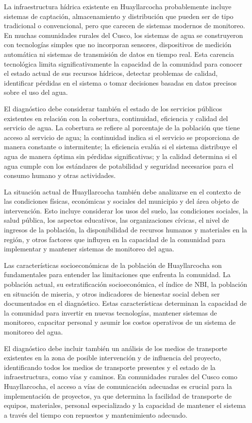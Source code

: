 La infraestructura hídrica existente en Huayllarcocha probablemente incluye sistemas de captación, almacenamiento y distribución que pueden ser de tipo tradicional o convencional, pero que carecen de sistemas modernos de monitoreo. En muchas comunidades rurales del Cusco, los sistemas de agua se construyeron con tecnologías simples que no incorporan sensores, dispositivos de medición automática ni sistemas de transmisión de datos en tiempo real. Esta carencia tecnológica limita significativamente la capacidad de la comunidad para conocer el estado actual de sus recursos hídricos, detectar problemas de calidad, identificar pérdidas en el sistema o tomar decisiones basadas en datos precisos sobre el uso del agua.

El diagnóstico debe considerar también el estado de los servicios públicos existentes en relación con la cobertura, continuidad, eficiencia y calidad del servicio de agua. La cobertura se refiere al porcentaje de la población que tiene acceso al servicio de agua; la continuidad indica si el servicio se proporciona de manera constante o intermitente; la eficiencia evalúa si el sistema distribuye el agua de manera óptima sin pérdidas significativas; y la calidad determina si el agua cumple con los estándares de potabilidad y seguridad necesarios para el consumo humano y otras actividades.


La situación actual de Huayllarcocha también debe analizarse en el contexto de las condiciones físicas, económicas y sociales del municipio y del área objeto de intervención. Esto incluye considerar los usos del suelo, las condiciones sociales, la salud pública, los aspectos educativos, las organizaciones cívicas, el nivel de ingresos de la población, la disponibilidad de recursos humanos y materiales en la región, y otros factores que influyen en la capacidad de la comunidad para implementar y mantener sistemas de monitoreo del agua.


Las características socioeconómicas de la población de Huayllarcocha son fundamentales para entender las limitaciones que enfrenta la comunidad. La población actual, su estratificación socioeconómica, el índice de NBI, la población en situación de miseria, y otros indicadores de bienestar social deben ser documentados en el diagnóstico. Estas características determinan la capacidad de la comunidad para invertir en nuevas tecnologías, mantener sistemas de monitoreo, capacitar personal y asumir los costos operativos de un sistema de monitoreo del agua.


El diagnóstico debe incluir también un análisis de los medios de transporte existentes en la zona de posible intervención y de influencia del proyecto, identificando todos los medios de transporte presentes y el estado de la infraestructura, como vías y caminos. En comunidades rurales del Cusco como Huayllarcocha, el acceso a vías de comunicación adecuadas es crucial para la implementación de proyectos, ya que determina la facilidad de transporte de equipos, materiales, personal especializado y la capacidad de mantener el sistema a través del tiempo con repuestos y mantenimiento adecuado.


